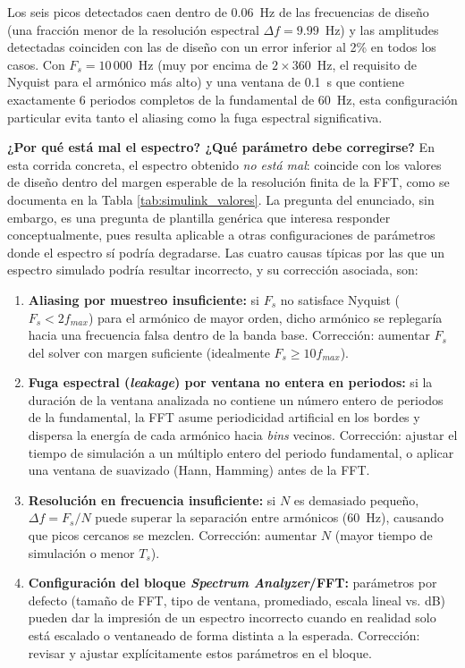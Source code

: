 \documentclass[conference]{IEEEtran}
\begin{document}
Los seis picos detectados caen dentro de 0.06~Hz de las frecuencias de diseño (una fracción menor de la resolución espectral $\Delta f = 9.99$~Hz) y las amplitudes detectadas coinciden con las de diseño con un error inferior al 2\% en todos los casos. Con $F_s=10\,000$~Hz (muy por encima de $2\times360$~Hz, el requisito de Nyquist para el armónico más alto) y una ventana de 0.1~s que contiene exactamente 6 periodos completos de la fundamental de 60~Hz, esta configuración particular evita tanto el aliasing como la fuga espectral significativa.

\textbf{¿Por qué está mal el espectro? ¿Qué parámetro debe corregirse?} En esta corrida concreta, el espectro obtenido \emph{no está mal}: coincide con los valores de diseño dentro del margen esperable de la resolución finita de la FFT, como se documenta en la Tabla \ref{tab:simulink_valores}. La pregunta del enunciado, sin embargo, es una pregunta de plantilla genérica que interesa responder conceptualmente, pues resulta aplicable a otras configuraciones de parámetros donde el espectro sí podría degradarse. Las cuatro causas típicas por las que un espectro simulado podría resultar incorrecto, y su corrección asociada, son:
\begin{enumerate}
    \item \textbf{Aliasing por muestreo insuficiente:} si $F_s$ no satisface Nyquist ($F_s < 2f_{max}$) para el armónico de mayor orden, dicho armónico se replegaría hacia una frecuencia falsa dentro de la banda base. Corrección: aumentar $F_s$ del solver con margen suficiente (idealmente $F_s \geq 10 f_{max}$).
    \item \textbf{Fuga espectral (\textit{leakage}) por ventana no entera en periodos:} si la duración de la ventana analizada no contiene un número entero de periodos de la fundamental, la FFT asume periodicidad artificial en los bordes y dispersa la energía de cada armónico hacia \textit{bins} vecinos. Corrección: ajustar el tiempo de simulación a un múltiplo entero del periodo fundamental, o aplicar una ventana de suavizado (Hann, Hamming) antes de la FFT.
    \item \textbf{Resolución en frecuencia insuficiente:} si $N$ es demasiado pequeño, $\Delta f = F_s/N$ puede superar la separación entre armónicos (60~Hz), causando que picos cercanos se mezclen. Corrección: aumentar $N$ (mayor tiempo de simulación o menor $T_s$).
    \item \textbf{Configuración del bloque \textit{Spectrum Analyzer}/FFT:} parámetros por defecto (tamaño de FFT, tipo de ventana, promediado, escala lineal vs. dB) pueden dar la impresión de un espectro incorrecto cuando en realidad solo está escalado o ventaneado de forma distinta a la esperada. Corrección: revisar y ajustar explícitamente estos parámetros en el bloque.
\end{enumerate}
\end{document}
